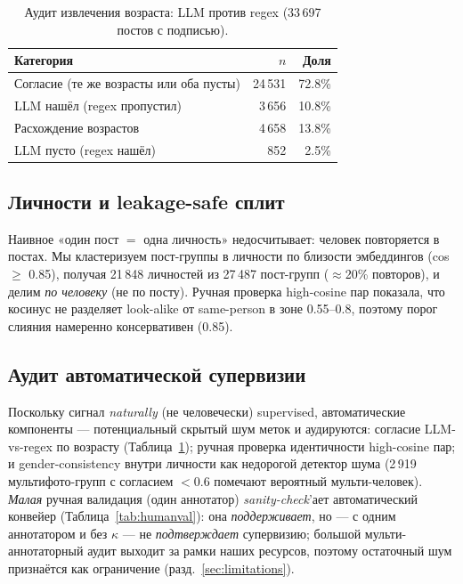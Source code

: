 \documentclass[journal]{IEEEtran}
\begin{document}
\begin{table}[!t]
\renewcommand{\arraystretch}{1.2}
\caption{Аудит извлечения возраста: LLM против regex (33\,697 постов с подписью).}
\label{tab:age}
\centering
\footnotesize
\begin{tabular}{@{}lrr@{}}
\toprule
Категория & $n$ & Доля \\
\midrule
Согласие (те же возрасты или оба пусты) & 24\,531 & 72.8\% \\
LLM нашёл (regex пропустил) & 3\,656 & 10.8\% \\
Расхождение возрастов & 4\,658 & 13.8\% \\
LLM пусто (regex нашёл) & 852 & 2.5\% \\
\bottomrule
\end{tabular}
\end{table}

\subsection{Личности и leakage-safe сплит}\label{sec:data-persons}
Наивное «один пост $=$ одна личность» недосчитывает: человек повторяется в постах. Мы кластеризуем пост-группы в личности по близости эмбеддингов (cos $\geq$ 0.85), получая 21\,848 личностей из 27\,487 пост-групп ($\approx$20\% повторов), и делим \emph{по человеку} (не по посту). Ручная проверка high-cosine пар показала, что косинус не разделяет look-alike от same-person в зоне 0.55--0.8, поэтому порог слияния намеренно консервативен (0.85).

\subsection{Аудит автоматической супервизии}\label{sec:data-audit}
Поскольку сигнал \emph{naturally} (не человечески) supervised, автоматические компоненты --- потенциальный скрытый шум меток и аудируются: согласие LLM-vs-regex по возрасту (Таблица~\ref{tab:age}); ручная проверка идентичности high-cosine пар; и gender-consistency внутри личности как недорогой детектор шума (2\,919 мультифото-групп с согласием $<$0.6 помечают вероятный мульти-человек). \emph{Малая} ручная валидация (один аннотатор) \emph{sanity-check}'ает автоматический конвейер (Таблица~\ref{tab:humanval}): она \emph{поддерживает}, но --- с одним аннотатором и без $\kappa$ --- не \emph{подтверждает} супервизию; большой мульти-аннотаторный аудит выходит за рамки наших ресурсов, поэтому остаточный шум признаётся как ограничение (разд.~\ref{sec:limitations}).
\end{document}

